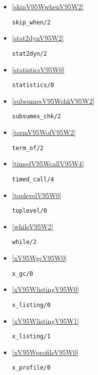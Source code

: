 \begin{itemize}
\item \ref{skipV95WwhenV95W2} 
\begin{verbatim}
skip_when/2
\end{verbatim}

\item \ref{stat2dynV95W2} 
\begin{verbatim}
stat2dyn/2
\end{verbatim}

\item \ref{statisticsV95W0} 
\begin{verbatim}
statistics/0
\end{verbatim}

\item \ref{subsumesV95WchkV95W2} 
\begin{verbatim}
subsumes_chk/2
\end{verbatim}

\item \ref{termV95WofV95W2} 
\begin{verbatim}
term_of/2
\end{verbatim}

\item \ref{timedV95WcallV95W4} 
\begin{verbatim}
timed_call/4
\end{verbatim}

\item \ref{toplevelV95W0} 
\begin{verbatim}
toplevel/0
\end{verbatim}

\item \ref{whileV95W2} 
\begin{verbatim}
while/2
\end{verbatim}

\item \ref{xV95WgcV95W0} 
\begin{verbatim}
x_gc/0
\end{verbatim}

\item \ref{xV95WlistingV95W0} 
\begin{verbatim}
x_listing/0
\end{verbatim}

\item \ref{xV95WlistingV95W1} 
\begin{verbatim}
x_listing/1
\end{verbatim}

\item \ref{xV95WprofileV95W0} 
\begin{verbatim}
x_profile/0
\end{verbatim}

\end{itemize}

